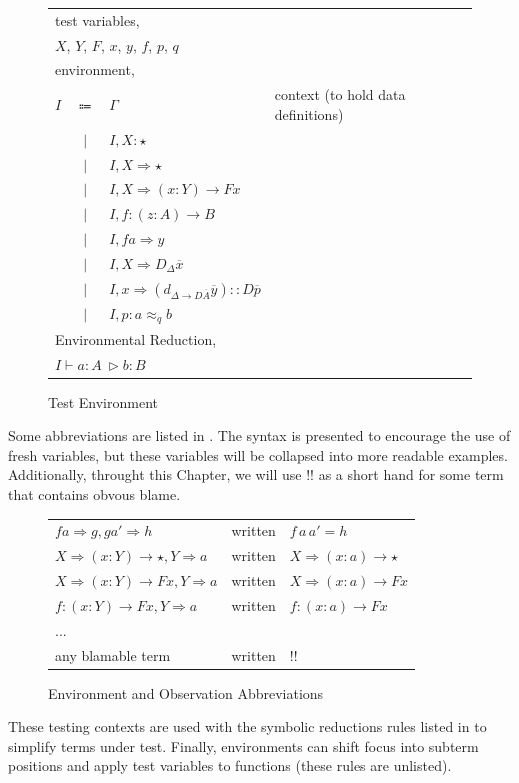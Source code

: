 \begin{figure}
\begin{tabular}{lcll}
\multicolumn{4}{l}{test variables,}\tabularnewline
\multicolumn{4}{l}{$X$, $Y$, $F$, $x$, $y$, $f$, $p$, $q$}\tabularnewline
\multicolumn{4}{l}{environment,}\tabularnewline
$I$ & $\Coloneqq$ & $\varGamma$ & context (to hold data definitions)\tabularnewline
  & $|$ & $I,X:\star$ & \tabularnewline
  & $|$ & $I,X\Rightarrow\star$ & \tabularnewline
  & $|$ & $I,X\Rightarrow\left(x:Y\right)\rightarrow Fx$ & \tabularnewline
  & $|$ & $I,f:\left(z:A\right)\rightarrow B$ & \tabularnewline
  & $|$ & $I,fa\Rightarrow y$ & \tabularnewline
  & $|$ & $I,X\Rightarrow D_{\Delta}\overline{x}$ & \tabularnewline
  & $|$ & $I,x\Rightarrow\left(d_{\Delta\rightarrow D\overline{A}}\overline{y}\right)::D\overline{p}$ & \tabularnewline
  & $|$ & $I,p:a\approx_{q}b$ & \tabularnewline
\multicolumn{4}{l}{Environmental Reduction,}\tabularnewline
\multicolumn{4}{l}{$I\vdash  a:A\ \vartriangleright b:B$}\tabularnewline
\end{tabular}

\caption{Test Environment}
\label{fig:sym-env-obs}
\end{figure}

Some abbreviations are listed in .
The syntax is presented to encourage the use of fresh variables, but these variables will be collapsed into more readable examples.
Additionally, throught this Chapter, we will use $!!$ as a short hand for some term that contains obvous blame.

\begin{figure}
\begin{tabular}{lcl}
$fa\Rightarrow g,ga'\Rightarrow h$ & written & $f\,a\,a'=h$\tabularnewline
$X\Rightarrow\left(x:Y\right)\rightarrow\star,Y\Rightarrow a$ & written & $X\Rightarrow\left(x:a\right)\rightarrow\star$\tabularnewline
$X\Rightarrow\left(x:Y\right)\rightarrow Fx,Y\Rightarrow a$ & written & $X\Rightarrow\left(x:a\right)\rightarrow Fx$\tabularnewline
$f:\left(x:Y\right)\rightarrow Fx,Y\Rightarrow a$ & written & $f:\left(x:a\right)\rightarrow Fx$\tabularnewline
... &  & \tabularnewline
any blamable term & written & !!\tabularnewline
\end{tabular}\caption{Environment and Observation Abbreviations}
\label{fig:sym-env-obs-abbiv}
\end{figure}

  
These testing contexts are used with the symbolic reductions rules listed in  to simplify terms under test.
Finally, environments can shift focus into subterm positions and apply test variables to functions (these rules are unlisted).


